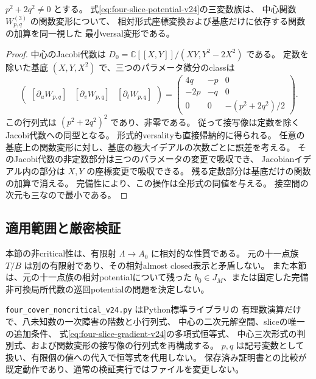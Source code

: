 \begin{corollary}
\label{cor:four-slice-potential-versal-v24}
$p^2+2q^2\ne0$ とする。
式\eqref{eq:four-slice-potential-v24}の三変数族は、
中心関数 $W^{(3)}_{p,q}$ の関数変形について、
相対形式座標変換および基底だけに依存する関数の加算を同一視した
最小versal変形である。
\end{corollary}

\begin{proof}
中心のJacobi代数は $D_0=\mathbb C[[X,Y]]/(XY,Y^2-2X^2)$ である。
定数を除いた基底 $(X,Y,X^2)$ で、三つのパラメータ微分のclassは
\[
 \begin{pmatrix}
 [\partial_u W_{p,q}]&[\partial_v W_{p,q}]&[\partial_t W_{p,q}]
 \end{pmatrix}
 =\begin{pmatrix}
 4q&-p&0\\
 -2p&-q&0\\
 0&0&-(p^2+2q^2)/2
 \end{pmatrix}.
\]
この行列式は $(p^2+2q^2)^2$ であり、非零である。
従って接写像は定数を除くJacobi代数への同型となる。
形式的versalityも直接帰納的に得られる。
任意の基底上の関数変形に対し、基底の極大イデアルの次数ごとに誤差を考える。
そのJacobi代数の非定数部分は三つのパラメータの変更で吸収でき、
Jacobianイデアル内の部分は $X,Y$ の座標変更で吸収できる。
残る定数部分は基底だけの関数の加算で消える。
完備性により、この操作は全形式の同値を与える。
接空間の次元も三なので最小である。
\end{proof}

\subsection{適用範囲と厳密検証}

本節の非critical性は、有限射 $\Lambda\to A_0$ に相対的な性質である。
元の十一点族 $T/B$ は別の有限射であり、その相対almost closed表示と矛盾しない。
また本節は、元の十一点族の相対potentialについて残った
$b_0\in J_M$、または固定した完備非可換局所代数の巡回potentialの問題を決定しない。

\nolinkurl{four_cover_noncritical_v24.py} はPython標準ライブラリの
有理数演算だけで、八未知数の一次障害の階数と小行列式、
中心の二次元解空間、sliceの唯一の追加条件、
式\eqref{eq:four-slice-gradient-v24}の多項式恒等式、
中心三次形式の判別式、および関数変形の接写像の行列式を再構成する。
$p,q$ は記号変数として扱い、有限個の値への代入で恒等式を代用しない。
保存済み証明書との比較が既定動作であり、通常の検証実行ではファイルを変更しない。
